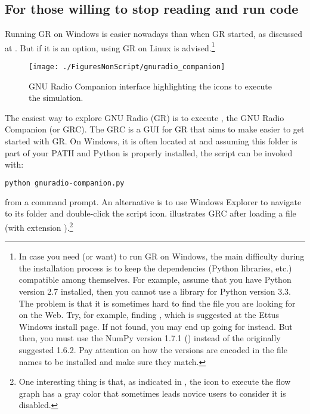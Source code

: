\subsection{For those willing to stop reading and run code}

Running GR on Windows is easier nowadays than when GR started, as discussed at . But if it is an option, using GR on Linux is advised.\footnote{In case you need (or want) to run GR on Windows, the main difficulty during the installation process is to keep the dependencies (Python libraries, etc.) compatible among themselves. For example, assume that you have Python version 2.7 installed, then you cannot use a library for Python version 3.3. The problem is that it is sometimes hard to find the file you are looking for on the Web. Try, for example, finding , which is suggested at the Ettus Windows install page. If not found, you may end up going for  instead. But then, you must use the NumPy version 1.7.1 () instead of the originally suggested 1.6.2. Pay attention on how the versions are encoded in the file names to be installed and make sure they match.}

\begin{figure}
\centering
\texttt{[image: ./FiguresNonScript/gnuradio\_companion]}
\caption{GNU Radio Companion interface highlighting the icons to execute the simulation.\label{fig:gnuradio_companion}}
\end{figure}

The easiest way to explore GNU Radio (GR) is to execute , the GNU Radio Companion (or GRC). The GRC is a GUI for GR that aims to make easier to get started with GR.
On Windows, it is often located at  and assuming this folder is part of your PATH and Python is properly installed, the script can be invoked with:
\begin{lstlisting}[language=Python]
python gnuradio-companion.py
\end{lstlisting}
from a command prompt. An alternative is to use Windows Explorer to navigate to its folder and double-click the script icon.  illustrates GRC after loading a file (with extension ).\footnote{One interesting thing is that, as indicated in , the icon to execute the flow graph has a gray color that sometimes leads novice users to consider it is disabled.}

